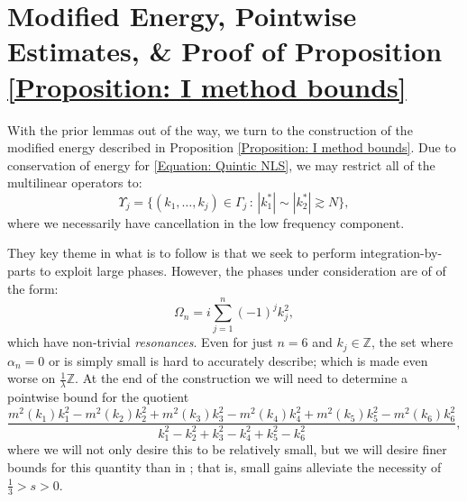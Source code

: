 \documentclass[12pt, letterpaper]{amsart}
\begin{document}
\section{Modified Energy, Pointwise Estimates, \& Proof of Proposition \ref{Proposition: I method bounds}}\label{Section: I-method Setup}
With the prior lemmas out of the way, we turn to the construction of the modified energy described in Proposition \ref{Proposition: I method bounds}. Due to conservation of energy for \eqref{Equation: Quintic NLS}, we may restrict all of the multilinear operators to:
\[
\Upsilon_j = \{(k_1,\dots,k_j)\in\Gamma_j\,:\,|k_1^*|\sim|k_2^*|\gtrsim N\},
\]
where we necessarily have cancellation in the low frequency component.

They key theme in what is to follow is that we seek to perform integration-by-parts to exploit large phases. However, the phases under consideration are of of the form:
\begin{equation}\label{Definition: alpha}
\Omega_n = i\sum_{j=1}^n(-1)^jk_j^2,
\end{equation}
which have non-trivial \textit{resonances}. Even for just $n = 6$ and $k_j\in\mathbb{Z}$, the set where $\alpha_n = 0$ or is simply small is hard to accurately describe; which is made even worse on $\tfrac{1}{\lambda}\mathbb{Z}$. At the end of the construction we will need to determine a pointwise bound for the quotient
\begin{equation}\label{Equation: Quotient to estimate}
\frac{m^2(k_1)k_1^2-m^2(k_2)k_2^2+m^2(k_3)k_3^2 - m^2(k_4)k_4^2+m^2(k_5)k_5^2-m^2(k_6)k_6^2}{k_1^2-k_2^2+k_3^2-k_4^2+k_5^2-k_6^2},
\end{equation}
where we will not only desire this to be relatively small, but we will desire finer bounds for this quantity than in \cite{li2011global,schippa2024improved}; that is, small gains alleviate the necessity of $\frac13 > s > 0$. 
\end{document}
